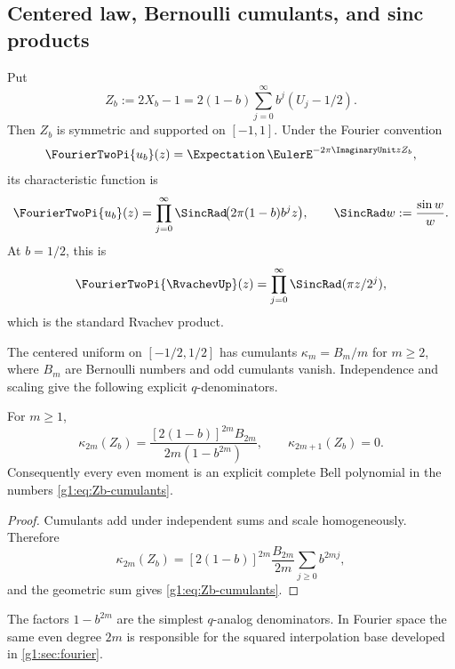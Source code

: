 \subsection{Centered law, Bernoulli cumulants, and sinc products}

Put
\begin{equation}
 Z_b:=2X_b-1
 =2(1-b)\sum_{j=0}^{\infty}b^j(U_j-1/2).
 \label{g1:eq:Zb}
\end{equation}
Then $Z_b$ is symmetric and supported on $[-1,1]$.  Under the Fourier
convention
\[
 \FourierTwoPi{u_b}(z)=\Expectation\,\EulerE^{-2\pi\ImaginaryUnit zZ_b},
\]
its characteristic function is
\begin{equation}
 \FourierTwoPi{u_b}(z)
 =\prod_{j=0}^{\infty}
 \SincRad\!\bigl(2\pi(1-b)b^jz\bigr),
 \qquad \SincRad w:=\frac{\sin w}{w}.
 \label{g1:eq:generic-sinc-product}
\end{equation}
At $b=1/2$, this is
\begin{equation}
 \FourierTwoPi{\RvachevUp}(z)=\prod_{j=0}^{\infty}\SincRad(\pi z/2^j),
 \label{g1:eq:up-sinc}
\end{equation}
which is the standard Rvachev product.

The centered uniform on $[-1/2,1/2]$ has cumulants
$\kappa_m=B_m/m$ for $m\ge2$, where $B_m$ are Bernoulli numbers and odd
cumulants vanish.  Independence and scaling give the following explicit
$q$-denominators.

\begin{proposition}
For $m\ge1$,
\begin{equation}
 \kappa_{2m}(Z_b)
 =\frac{[2(1-b)]^{2m}B_{2m}}
 {2m(1-b^{2m})},
 \qquad \kappa_{2m+1}(Z_b)=0.
 \label{g1:eq:Zb-cumulants}
\end{equation}
Consequently every even moment is an explicit complete Bell polynomial in the
numbers \eqref{g1:eq:Zb-cumulants}.
\end{proposition}

\begin{proof}
Cumulants add under independent sums and scale homogeneously.  Therefore
\[
 \kappa_{2m}(Z_b)
 =[2(1-b)]^{2m}\frac{B_{2m}}{2m}
 \sum_{j\ge0}b^{2mj},
\]
and the geometric sum gives \eqref{g1:eq:Zb-cumulants}.
\end{proof}

The factors $1-b^{2m}$ are the simplest $q$-analog denominators.  In Fourier
space the same even degree $2m$ is responsible for the squared interpolation
base developed in \cref{g1:sec:fourier}.

